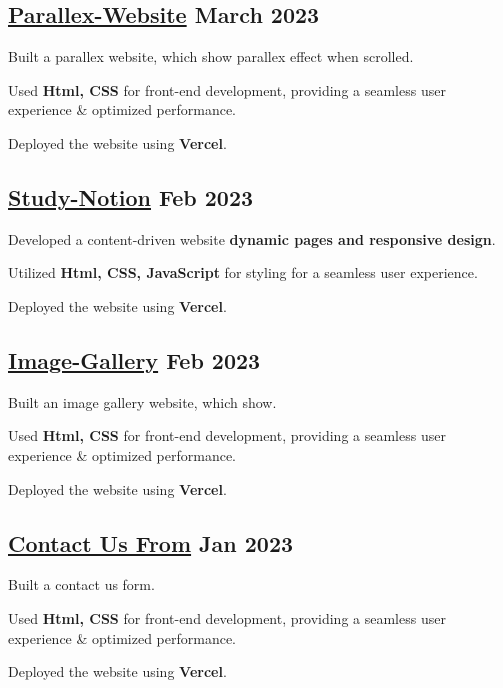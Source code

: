 \subsection{{\href{https://parallex-website-css.vercel.app/}{Parallex-Website} \hfill March 2023}}
\begin{zitemize}
\item Built a parallex website, which show parallex effect when scrolled.
\item Used \textbf{Html, CSS} for front-end development, providing a seamless user experience \& optimized performance.
\item Deployed the website using \textbf{Vercel}.
\end{zitemize}


\subsection{{\href{https://study-notion.vercel.app/}{Study-Notion} \hfill Feb 2023}}
\begin{zitemize}
\item Developed a content-driven website \textbf{dynamic pages and responsive design}.
\item Utilized \textbf{Html, CSS, JavaScript} for styling for a seamless user experience.
\item Deployed the website using \textbf{Vercel}.
\end{zitemize}

\subsection{{\href{https://anmol-image-gallery.vercel.app/}{Image-Gallery} \hfill Feb 2023}}
\begin{zitemize}
\item Built an image gallery website, which show.
\item Used \textbf{Html, CSS} for front-end development, providing a seamless user experience \& optimized performance.
\item Deployed the website using \textbf{Vercel}.
\end{zitemize}


\subsection{{\href{https://grand-bavarois-410588.netlify.app/}{Contact Us From} \hfill Jan 2023}}
\begin{zitemize}
\item Built a contact us form.
\item Used \textbf{Html, CSS} for front-end development, providing a seamless user experience \& optimized performance.
\item Deployed the website using \textbf{Vercel}.
\end{zitemize}

